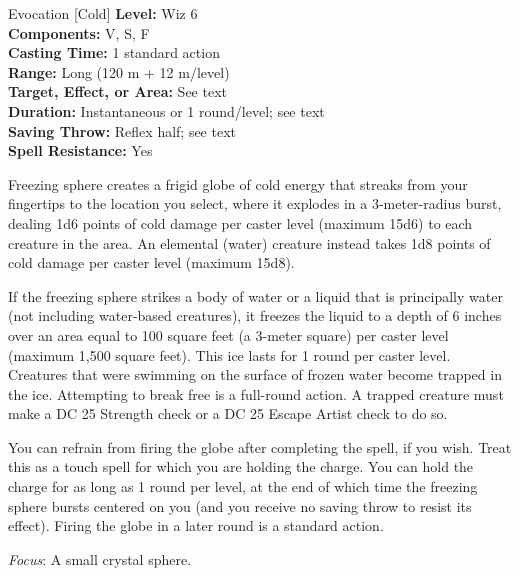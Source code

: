 {Evocation [Cold]}
{
	\textbf{Level:}
	Wiz 6\\
	\textbf{Components:}
	V, S, F\\
	\textbf{Casting Time:}
	1 standard action\\
	\textbf{Range:}
	Long (120 m + 12 m/level)\\
	\textbf{Target, Effect, or Area:}
	See text\\
	\textbf{Duration:}
	Instantaneous or 1 round/level; see text\\
	\textbf{Saving Throw:}
	Reflex half; see text\\
	\textbf{Spell Resistance:}
	Yes\\
}
{
	Freezing sphere creates a frigid globe of cold energy that streaks from your fingertips to the location you select, where it explodes in a 3-meter-radius burst, dealing 1d6 points of cold damage per caster level (maximum 15d6) to each creature in the area. An elemental (water) creature instead takes 1d8 points of cold damage per caster level (maximum 15d8).

	If the freezing sphere strikes a body of water or a liquid that is principally water (not including water-based creatures), it freezes the liquid to a depth of 6 inches over an area equal to 100 square feet (a 3-meter square) per caster level (maximum 1,500 square feet). This ice lasts for 1 round per caster level. Creatures that were swimming on the surface of frozen water become trapped in the ice. Attempting to break free is a full-round action. A trapped creature must make a DC 25 Strength check or a DC 25 Escape Artist check to do so.

	You can refrain from firing the globe after completing the spell, if you wish. Treat this as a touch spell for which you are holding the charge. You can hold the charge for as long as 1 round per level, at the end of which time the freezing sphere bursts centered on you (and you receive no saving throw to resist its effect). Firing the globe in a later round is a standard action.

	\textit{Focus}:
	A small crystal sphere.

}
